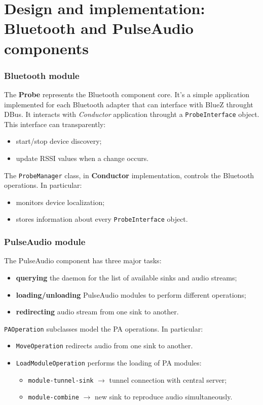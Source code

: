 \documentclass{beamer}
\begin{document}

\section[Design and implementation]{Design and implementation: Bluetooth and PulseAudio components}

\begin{frame}
\frametitle{Bluetooth module}
The \textbf{Probe} represents the Bluetooth component core. It's a simple application implemented for each Bluetooth adapter that can interface with BlueZ throught DBus. It interacts with \textsl{Conductor} application throught a \texttt{ProbeInterface} object.\\ This interface can transparently:
\begin{itemize}
	\item start/stop device discovery;
	\item update RSSI values when a change occurs.
\end{itemize}
The \texttt{ProbeManager} class, in \textbf{Conductor} implementation, controls the Bluetooth operations. In particular:
\begin{itemize}
	\item monitors device localization;
	\item stores information about every \texttt{ProbeInterface} object.
\end{itemize}
\end{frame}

\begin{frame}
\frametitle{PulseAudio module}
The PulseAudio component has three major tasks:
\begin{itemize}
	\item \textbf{querying} the daemon for the list of available sinks and audio streams;
	\item \textbf{loading/unloading} PulseAudio modules to perform different operations;
	\item \textbf{redirecting} audio stream from one sink to another.
\end{itemize}
\texttt{PAOperation} subclasses model the PA operations. In particular: \\
\begin{itemize}
	\item \texttt{MoveOperation} redirects audio from one sink to another.
	\item \texttt{LoadModuleOperation} performs the loading of PA modules:
		\begin{itemize}
			\item \texttt{module-tunnel-sink} $\rightarrow$ tunnel connection with central server;
			\item \texttt{module-combine} $\rightarrow$ new sink to reproduce audio simultaneously.
		\end{itemize}
	\end{itemize}
\end{frame}
\end{document}
